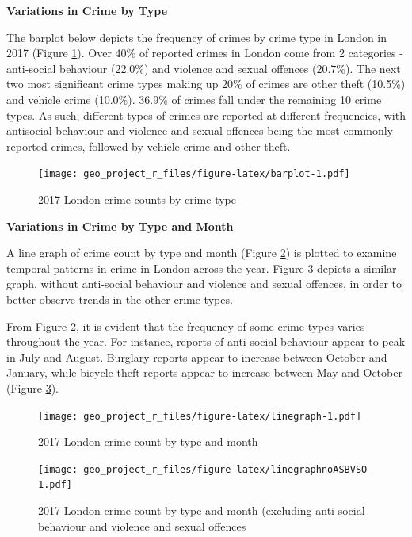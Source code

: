 \documentclass[]{article}
\begin{document}
\textbf{Variations in Crime by Type}

The barplot below depicts the frequency of crimes by crime type in
London in 2017 (Figure \ref{fig:barplot}). Over 40\% of reported crimes
in London come from 2 categories - anti-social behaviour (22.0\%) and
violence and sexual offences (20.7\%). The next two most significant
crime types making up 20\% of crimes are other theft (10.5\%) and
vehicle crime (10.0\%). 36.9\% of crimes fall under the remaining 10
crime types. As such, different types of crimes are reported at
different frequencies, with antisocial behaviour and violence and sexual
offences being the most commonly reported crimes, followed by vehicle
crime and other theft.

\begin{figure}
\centering
\texttt{[image: geo\_project\_r\_files/figure-latex/barplot-1.pdf]}
\caption{\label{fig:barplot}2017 London crime counts by crime type}
\end{figure}

\textbf{Variations in Crime by Type and Month}

A line graph of crime count by type and month (Figure
\ref{fig:linegraph}) is plotted to examine temporal patterns in crime in
London across the year. Figure \ref{fig:linegraphnoASBVSO} depicts a
similar graph, without anti-social behaviour and violence and sexual
offences, in order to better observe trends in the other crime types.

From Figure \ref{fig:linegraph}, it is evident that the frequency of
some crime types varies throughout the year. For instance, reports of
anti-social behaviour appear to peak in July and August. Burglary
reports appear to increase between October and January, while bicycle
theft reports appear to increase between May and October (Figure
\ref{fig:linegraphnoASBVSO}).

\begin{figure}
\centering
\texttt{[image: geo\_project\_r\_files/figure-latex/linegraph-1.pdf]}
\caption{\label{fig:linegraph}2017 London crime count by type and month}
\end{figure}

\begin{figure}
\centering
\texttt{[image: geo\_project\_r\_files/figure-latex/linegraphnoASBVSO-1.pdf]}
\caption{\label{fig:linegraphnoASBVSO}2017 London crime count by type and
month (excluding anti-social behaviour and violence and sexual offences}
\end{figure}
\end{document}

